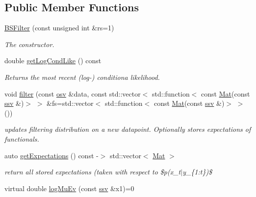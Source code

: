 \subsection*{Public Member Functions}
\begin{DoxyCompactItemize}
\item 
\hyperlink{classpf_1_1BSFilter_aca64b4c5d1bcc805aecb261b40203a04}{B\+S\+Filter} (const unsigned int \&rs=1)
\begin{DoxyCompactList}\small\item\em The constructor. \end{DoxyCompactList}\item 
double \hyperlink{classpf_1_1BSFilter_a72063c3e2e09f1fefb29563c1929a490}{get\+Log\+Cond\+Like} () const 
\begin{DoxyCompactList}\small\item\em Returns the most recent (log-\/) conditiona likelihood. \end{DoxyCompactList}\item 
void \hyperlink{classpf_1_1BSFilter_ab3e3a45671cb71e473a5bf6d6c363d9c}{filter} (const \hyperlink{classpf_1_1BSFilter_a46aaa88331b87e69ad3d1fcdc3b1db4e}{osv} \&data, const std\+::vector$<$ std\+::function$<$ const \hyperlink{classpf_1_1BSFilter_a0fea63439948d095468ec14792abb396}{Mat}(const \hyperlink{classpf_1_1BSFilter_a95fa891a3af39cb14cfe8521fb1d0f88}{ssv} \&)$>$ $>$ \&fs=std\+::vector$<$ std\+::function$<$ const \hyperlink{classpf_1_1BSFilter_a0fea63439948d095468ec14792abb396}{Mat}(const \hyperlink{classpf_1_1BSFilter_a95fa891a3af39cb14cfe8521fb1d0f88}{ssv} \&)$>$ $>$())
\begin{DoxyCompactList}\small\item\em updates filtering distribution on a new datapoint. Optionally stores expectations of functionals. \end{DoxyCompactList}\item 
auto \hyperlink{classpf_1_1BSFilter_affea414129ce50176ab0f873d5339e18}{get\+Expectations} () const -\/$>$ std\+::vector$<$ \hyperlink{classpf_1_1BSFilter_a0fea63439948d095468ec14792abb396}{Mat} $>$
\begin{DoxyCompactList}\small\item\em return all stored expectations (taken with respect to \$p(x\+\_\+t$\vert$y\+\_\+\{1\+:t\})\$ \end{DoxyCompactList}\item 
virtual double \hyperlink{classpf_1_1BSFilter_a1806a607fed9163427207cc7eb21e2dd}{log\+Mu\+Ev} (const \hyperlink{classpf_1_1BSFilter_a95fa891a3af39cb14cfe8521fb1d0f88}{ssv} \&x1)=0

\end{DoxyCompactItemize}
